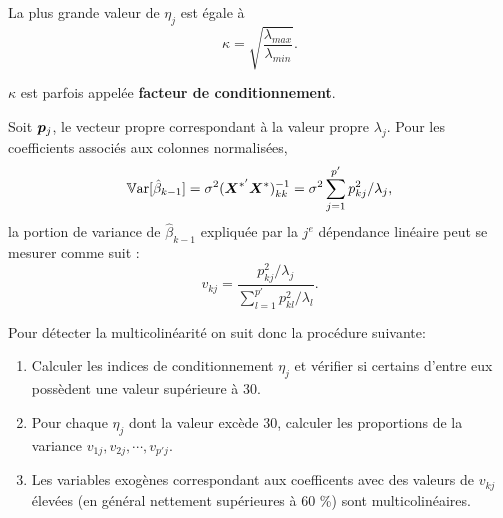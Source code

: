 La plus grande valeur de $\eta_j$ est égale à
$$\kappa=\sqrt{\frac{\lambda_{max}}{\lambda_{min}}}.$$

$\kappa$ est parfois appelée \textbf{ facteur de conditionnement}.


%
%
%
%


Soit ${\bm{p}}_j$, le vecteur propre correspondant à la valeur propre $\lambda_j$.
Pour les coefficients associés aux colonnes normalisées,
$$\mathbb{V}\text{ar}[\hat\beta_{k-1}]=\sigma^2({\bm{X}}^{*'}{\bm{X}}^*)^{-1}_{kk}=\sigma^2\sum_{j=1}^{p'}p_{kj}^2/\lambda_j,$$
la portion de variance de $\hat\beta_{k-1}$ expliquée par la $j^{e}$ dépendance linéaire peut se mesurer comme suit :
$$v_{kj}=\frac{p_{kj}^2/\lambda_j}{\sum\limits_{l=1}^{p'}p_{kl}^2/\lambda_l}.$$

Pour détecter la multicolinéarité on suit donc la procédure suivante:
\begin{enumerate}
\item Calculer les indices de conditionnement $\eta_j$ et vérifier si certains d'entre eux possèdent une valeur supérieure à 30.
\item Pour chaque $\eta_j$ dont la valeur excède 30, calculer les proportions de la variance $v_{1j},v_{2j},\cdots,v_{p'j}$.
\item Les variables exogènes correspondant aux coefficents avec des valeurs de $v_{kj}$ élevées (en général nettement supérieures à 60 \%) sont multicolinéaires.
\end{enumerate}

